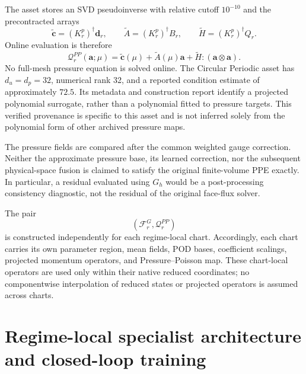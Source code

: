 \documentclass{article}
\begin{document}
The asset stores an SVD pseudoinverse with relative cutoff $10^{-10}$ and the precontracted arrays
\begin{equation}
 \widetilde{\bm c}=(K_r^p)^\dagger\bm d_r,\qquad
 \widetilde A=(K_r^p)^\dagger B_r,\qquad
 \widetilde H=(K_r^p)^\dagger Q_r.
\end{equation}
Online evaluation is therefore
\begin{equation}
 \mathcal Q_r^{PP}(\bm a;\mu)
 =\widetilde{\bm c}(\mu)+\widetilde A(\mu)\bm a+
   \widetilde H:(\bm a\otimes\bm a).
 \label{eq:app_pressure_poisson_map}
\end{equation}
No full-mesh pressure equation is solved online. The Circular Periodic asset has $d_u=d_p=32$, numerical rank 32, and a reported condition estimate of approximately $72.5$. Its metadata and construction report identify a projected polynomial surrogate, rather than a polynomial fitted to pressure targets. This verified provenance is specific to this asset and is not inferred solely from the polynomial form of other archived pressure maps.

The pressure fields are compared after the common weighted gauge correction. Neither the approximate pressure base, its learned correction, nor the subsequent physical-space fusion is claimed to satisfy the original finite-volume PPE exactly. In particular, a residual evaluated using $G_h$ would be a post-processing consistency diagnostic, not the residual of the original face-flux solver.

The pair
\begin{equation}
    \left(
        \mathcal F_r^G,
        \mathcal Q_r^{PP}
    \right)
\end{equation}
is constructed independently for each regime-local chart.
Accordingly, each chart carries its own parameter region, mean fields,
POD bases, coefficient scalings, projected momentum operators, and
Pressure--Poisson map.
These chart-local operators are used only within their native reduced
coordinates; no componentwise interpolation of reduced states or projected
operators is assumed across charts.


\section{Regime-local specialist architecture and closed-loop training}
\label{app:specialists}
\end{document}
